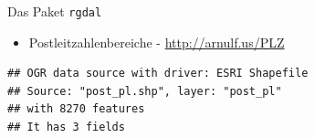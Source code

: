 \begin{frame}[fragile]{Das Paket \texttt{rgdal}}

\begin{itemize}
\tightlist
\item
  Postleitzahlenbereiche - \url{http://arnulf.us/PLZ}
\end{itemize}

\begin{Shaded}
\begin{Highlighting}[]
\end{Highlighting}
\end{Shaded}

\begin{verbatim}
## OGR data source with driver: ESRI Shapefile 
## Source: "post_pl.shp", layer: "post_pl"
## with 8270 features
## It has 3 fields
\end{verbatim}

\begin{Shaded}
\begin{Highlighting}[]
\NormalTok{(}\NormalTok{)}
\StringTok{ }\NormalTok{ (}\NormalTok{,}\NormalTok{)}
\end{Highlighting}
\end{Shaded}

\begin{Shaded}
\begin{Highlighting}[]
\StringTok{ }\NormalTok{ (}\NormalTok{,}\NormalTok{)}
\end{Highlighting}
\end{Shaded}

\end{frame}

